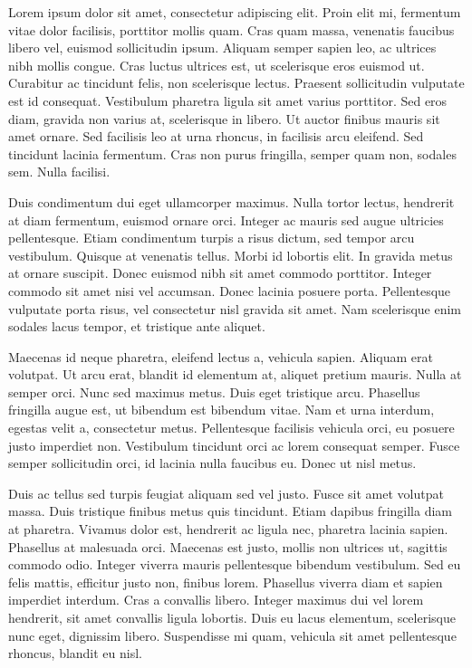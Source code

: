 \documentclass[11pt,a4paper]{article}
\begin{document}
Lorem ipsum dolor sit amet, consectetur adipiscing elit. Proin elit mi, fermentum vitae dolor facilisis, porttitor mollis quam. Cras quam massa, venenatis faucibus libero vel, euismod sollicitudin ipsum. Aliquam semper sapien leo, ac ultrices nibh mollis congue. Cras luctus ultrices est, ut scelerisque eros euismod ut. Curabitur ac tincidunt felis, non scelerisque lectus. Praesent sollicitudin vulputate est id consequat. Vestibulum pharetra ligula sit amet varius porttitor. Sed eros diam, gravida non varius at, scelerisque in libero. Ut auctor finibus mauris sit amet ornare. Sed facilisis leo at urna rhoncus, in facilisis arcu eleifend. Sed tincidunt lacinia fermentum. Cras non purus fringilla, semper quam non, sodales sem. Nulla facilisi.

Duis condimentum dui eget ullamcorper maximus. Nulla tortor lectus, hendrerit at diam fermentum, euismod ornare orci. Integer ac mauris sed augue ultricies pellentesque. Etiam condimentum turpis a risus dictum, sed tempor arcu vestibulum. Quisque at venenatis tellus. Morbi id lobortis elit. In gravida metus at ornare suscipit. Donec euismod nibh sit amet commodo porttitor. Integer commodo sit amet nisi vel accumsan. Donec lacinia posuere porta. Pellentesque vulputate porta risus, vel consectetur nisl gravida sit amet. Nam scelerisque enim sodales lacus tempor, et tristique ante aliquet.

Maecenas id neque pharetra, eleifend lectus a, vehicula sapien. Aliquam erat volutpat. Ut arcu erat, blandit id elementum at, aliquet pretium mauris. Nulla at semper orci. Nunc sed maximus metus. Duis eget tristique arcu. Phasellus fringilla augue est, ut bibendum est bibendum vitae. Nam et urna interdum, egestas velit a, consectetur metus. Pellentesque facilisis vehicula orci, eu posuere justo imperdiet non. Vestibulum tincidunt orci ac lorem consequat semper. Fusce semper sollicitudin orci, id lacinia nulla faucibus eu. Donec ut nisl metus.

Duis ac tellus sed turpis feugiat aliquam sed vel justo. Fusce sit amet volutpat massa. Duis tristique finibus metus quis tincidunt. Etiam dapibus fringilla diam at pharetra. Vivamus dolor est, hendrerit ac ligula nec, pharetra lacinia sapien. Phasellus at malesuada orci. Maecenas est justo, mollis non ultrices ut, sagittis commodo odio. Integer viverra mauris pellentesque bibendum vestibulum. Sed eu felis mattis, efficitur justo non, finibus lorem. Phasellus viverra diam et sapien imperdiet interdum. Cras a convallis libero. Integer maximus dui vel lorem hendrerit, sit amet convallis ligula lobortis. Duis eu lacus elementum, scelerisque nunc eget, dignissim libero. Suspendisse mi quam, vehicula sit amet pellentesque rhoncus, blandit eu nisl.
\end{document}
